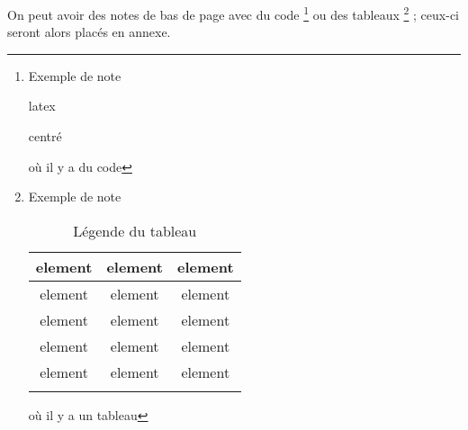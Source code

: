 \documentclass[small]{zmdocument}
\begin{document}
On peut avoir des notes de bas de page avec du code
\footnote{Exemple de note
\begin{Appendix}
\begin{CodeBlock}{latex}
\begin{center}
   centré
\end{center}
\end{CodeBlock}
\end{Appendix}
où il y a du code
}
ou des tableaux
\footnote{Exemple de note
\begin{Appendix}
\begin{longtabu}{|c|c|c|} \hline
   element & element & element\\ \hline
   element & element & element\\ \hline
   element & element & element\\ \hline
   element & element & element\\ \hline
   element & element & element\\ \hline
   \caption{Légende du tableau}
   \end{longtabu}
\end{Appendix}
où il y a un tableau
} ;
ceux-ci seront alors placés en annexe.
\end{document}
